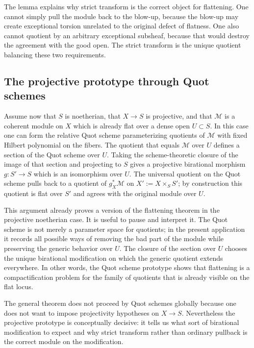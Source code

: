 \documentclass[11pt,oneside]{article}
\newcommand{\M}{\mathcal M}
\begin{document}
The lemma explains why strict transform is the correct object for flattening.  One cannot simply pull the module back to the blow-up, because the blow-up may create exceptional torsion unrelated to the original defect of flatness.  One also cannot quotient by an arbitrary exceptional subsheaf, because that would destroy the agreement with the good open.  The strict transform is the unique quotient balancing these two requirements.

\subsection{The projective prototype through Quot schemes}

Assume now that $S$ is noetherian, that $X\to S$ is projective, and that $\M$ is a coherent module on $X$ which is already flat over a dense open $U\subset S$.  In this case one can form the relative Quot scheme parameterizing quotients of $\M$ with fixed Hilbert polynomial on the fibers.  The quotient that equals $\M$ over $U$ defines a section of the Quot scheme over $U$.  Taking the scheme-theoretic closure of the image of that section and projecting to $S$ gives a projective birational morphism $g\colon S'\to S$ which is an isomorphism over $U$.  The universal quotient on the Quot scheme pulls back to a quotient of $g_X^*\M$ on $X':=X\times_S S'$; by construction this quotient is flat over $S'$ and agrees with the original module over $U$.

This argument already proves a version of the flattening theorem in the projective noetherian case.  It is useful to pause and interpret it.  The Quot scheme is not merely a parameter space for quotients; in the present application it records all possible ways of removing the bad part of the module while preserving the generic behavior over $U$.  The closure of the section over $U$ chooses the unique birational modification on which the generic quotient extends everywhere.  In other words, the Quot scheme prototype shows that flattening is a compactification problem for the family of quotients that is already visible on the flat locus.

The general theorem does not proceed by Quot schemes globally because one does not want to impose projectivity hypotheses on $X\to S$.  Nevertheless the projective prototype is conceptually decisive: it tells us what sort of birational modification to expect and why strict transform rather than ordinary pullback is the correct module on the modification.
\end{document}
